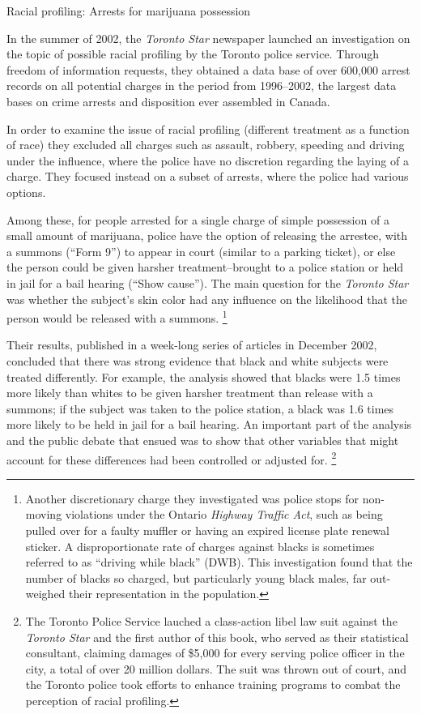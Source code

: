 \documentclass[11pt]{book}
\begin{document}
\begin{Example}[arrests]{Racial profiling: Arrests for marijuana possession}

In the summer of 2002, the \emph{Toronto Star} newspaper launched an investigation
on the topic of possible racial profiling by the Toronto police service.
Through freedom of information requests, they obtained a data base of over
600,000 arrest records on all potential charges in the period from 
1996--2002, the largest data bases on crime arrests and disposition 
ever assembled in Canada.

In order to examine the issue of racial profiling (different treatment as a function of race)
they excluded all charges such as assault,
robbery, speeding and driving under the influence, where the police have
no discretion regarding the laying of a charge. They focused instead on 
a subset of arrests, where the police had various options.

Among these, for people arrested for a single charge of
simple possession of a small amount of marijuana, police have the
option of releasing the arrestee, with a summons (``Form 9'') to appear in court
(similar to a parking ticket), or else the person could be given
harsher treatment--brought to a police station or held in jail
for a bail hearing (``Show cause'').  The main question for the \emph{Toronto Star}
was whether the subject's skin color had any influence on the 
likelihood that the person would be released with a summons.%
\footnote{
Another discretionary charge they investigated was police stops for non-moving violations
under the Ontario \emph{Highway Traffic Act}, such as being pulled over
for a faulty muffler or having an expired license plate renewal sticker.
A disproportionate rate of charges against blacks is sometimes referred to
as ``driving while black'' (DWB). This investigation found that the number of blacks
so charged, but particularly young black males, far out-weighed their representation
in the population.
}

Their results, published in a week-long series of articles in December 2002,
concluded that there was strong evidence that black and white subjects were
treated differently. For example, the analysis showed that blacks were
1.5 times more likely than whites to be given harsher treatment than release
with a summons; if the subject was taken to the police station, a black was
1.6 times more likely to be held in jail for a bail hearing. An important
part of the analysis and the public debate that ensued was to show that
other variables that might account for these differences had been controlled
or adjusted for.%
\footnote{
The Toronto Police Service lauched a class-action libel
law suit against the \emph{Toronto Star} and the first author of this
book, who served as their statistical consultant, claiming damages of 
\$5,000 for every serving police officer in the city, a total of over
20 million dollars.  The suit was thrown out of court, and the Toronto
police took efforts to enhance training programs to combat the perception of racial profiling.
}


\end{Example}
\end{document}
